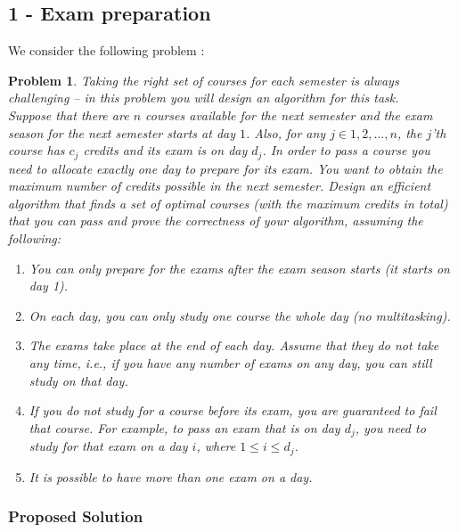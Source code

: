 \documentclass{article}
\newtheorem{problem}{Problem}
\begin{document}
\begin{flushleft}

\subsection*{1 - Exam preparation}

We consider the following problem :
\begin{problem}
    Taking the right set of courses for each semester is always challenging – in this problem you will design an algorithm for this task. \\
    Suppose that there are $n$ courses available for the next semester and the exam season for the next semester starts at day $1$. Also, for any $j \in {1, 2, . . . , n}$, the $j$’th course has $c_j$ credits and its exam is on day $d_j$. In order to pass a course you need to allocate exactly one day to prepare for its exam. You want to obtain the maximum number of credits possible in the next semester. Design an efficient algorithm that finds a set of optimal courses (with the maximum credits in total) that you can pass and prove the correctness of your algorithm, assuming the following:
    \begin{enumerate}
        \item You can only prepare for the exams after the exam season starts (it starts on day 1).
        \item On each day, you can only study one course the whole day (no multitasking).
        \item The exams take place at the end of each day. Assume that they do not take any time, i.e., if you have any number of exams on any day, you can still study on that day.
        \item If you do not study for a course before its exam, you are guaranteed to fail that course. For example, to pass an exam that is on day $d_j$, you need to study for that exam on a day $i$, where $1 \leq i \leq d_j$.
        \item It is possible to have more than one exam on a day.
    \end{enumerate}

\end{problem}

\subsubsection*{Proposed Solution}


\end{flushleft}
\end{document}
